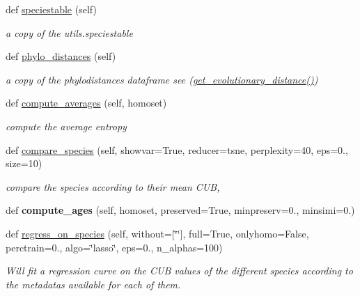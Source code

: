 \begin{DoxyCompactItemize}
def \mbox{\hyperlink{class_py_c_u_b_1_1py_c_u_b_1_1_py_c_u_b_af3e280c265200f13946e4bdcb4cd9dd0}{speciestable}} (self)
\begin{DoxyCompactList}\small\item\em a copy of the utils.\+speciestable \end{DoxyCompactList}\item 
def \mbox{\hyperlink{class_py_c_u_b_1_1py_c_u_b_1_1_py_c_u_b_a2ea40ac1dd5b4ad8847ec12c867d457f}{phylo\+\_\+distances}} (self)
\begin{DoxyCompactList}\small\item\em a copy of the phylodistances dataframe see (\mbox{\hyperlink{class_py_c_u_b_1_1py_c_u_b_1_1_py_c_u_b_af0d7bed125f4437bea6b8051f9922c1d}{get\+\_\+evolutionary\+\_\+distance()}}) \end{DoxyCompactList}\item 
def \mbox{\hyperlink{class_py_c_u_b_1_1py_c_u_b_1_1_py_c_u_b_a9526c0d10381daf5abc8ea120454e701}{compute\+\_\+averages}} (self, homoset)
\begin{DoxyCompactList}\small\item\em compute the average entropy \end{DoxyCompactList}\item 
def \mbox{\hyperlink{class_py_c_u_b_1_1py_c_u_b_1_1_py_c_u_b_ad7f24b316bc8c257719da20c0792ec01}{compare\+\_\+species}} (self, showvar=True, reducer=\textquotesingle{}tsne\textquotesingle{}, perplexity=40, eps=0., size=10)
\begin{DoxyCompactList}\small\item\em compare the species according to their mean C\+UB, \end{DoxyCompactList}\item 
\mbox{\label{class_py_c_u_b_1_1py_c_u_b_1_1_py_c_u_b_af1cab3e8d69796c1a9a54a57a76228cd}} 
def {\bfseries compute\+\_\+ages} (self, homoset, preserved=True, minpreserv=0., minsimi=0.)
\item 
def \mbox{\hyperlink{class_py_c_u_b_1_1py_c_u_b_1_1_py_c_u_b_af37319783148fc8864d894b3e2f89078}{regress\+\_\+on\+\_\+species}} (self, without=\mbox{[}\char`\"{}\char`\"{}\mbox{]}, full=True, onlyhomo=False, perctrain=0., algo=\char`\"{}lasso\char`\"{}, eps=0., n\+\_\+alphas=100)
\begin{DoxyCompactList}\small\item\em Will fit a regression curve on the C\+UB values of the different species according to the metadatas available for each of them. \end{DoxyCompactList}\item 

\end{DoxyCompactItemize}
